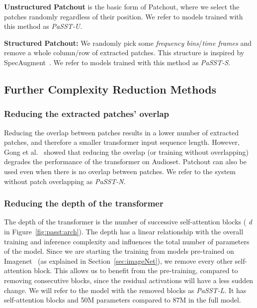 \documentclass[a4paper]{article}
\begin{document}
\textbf{Unstructured Patchout} is the basic form of Patchout, where we select the patches randomly regardless of their position. We refer to models trained with this method as \emph{PaSST-U}.

\textbf{Structured Patchout:} We randomly pick some \emph{frequency bins}/\emph{time frames} and remove a whole column/row of extracted patches. This structure is inspired by SpecAugment~\cite{ParkCZCZCL19Specaugment}. We refer to models trained with this method as \emph{PaSST-S}.






\subsection{Further Complexity Reduction Methods}
\label{sub:sec:further:complex:reduce}


\subsubsection{Reducing the extracted patches' overlap}
Reducing the overlap between patches results in a lower number of extracted patches, and therefore a smaller  transformer input sequence length. However, Gong et al.~\cite{gong21ast} showed that reducing the overlap (or training without overlapping) degrades the performance of the transformer on Audioset. Patchout can also be used even when there is no overlap between patches. We refer to the system without patch overlapping as \emph{PaSST-N}.


\subsubsection{Reducing the depth of the transformer}
\label{sub:sec:reduce:depth}
The depth of the transformer is the number of successive self-attention blocks ( \emph{d} in Figure~\ref{fig:passt:arch}). The depth has a linear relationship with the overall training and inference complexity and influences the total number of parameters of the model. Since we are starting the training from models pre-trained on Imagenet~\cite{dengImagenetLargescaleHierarchical2009} (as explained in Section~\ref{sec:imageNet}), we remove every other self-attention block. This allows us to benefit from the pre-training, compared to removing consecutive blocks, since the residual activations will have a less sudden change. We will refer to the model with the removed blocks as \emph{PaSST-L}. It has  self-attention blocks and 50M parameters compared to 87M in the full model.
\end{document}
